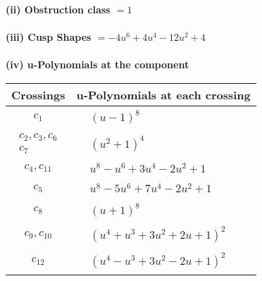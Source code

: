 \documentclass[1p]{elsarticle_modified}
\theoremstyle{definition}
\begin{document}
\flushleft \textbf{(ii) Obstruction class $= 1$}\\~\\
\flushleft \textbf{(iii) Cusp Shapes $= -4 u^6+4 u^4-12 u^2+4$}\\~\\
\newpage\renewcommand{\arraystretch}{1}
\flushleft \textbf{(iv) u-Polynomials at the component}\newline \\
\begin{tabular}{m{50pt}|m{274pt}}
Crossings & \hspace{64pt}u-Polynomials at each crossing \\
\hline $$\begin{aligned}c_{1}\end{aligned}$$&$\begin{aligned}
&(u-1)^8
\end{aligned}$\\
\hline $$\begin{aligned}c_{2},c_{3},c_{6}\\c_{7}\end{aligned}$$&$\begin{aligned}
&(u^2+1)^4
\end{aligned}$\\
\hline $$\begin{aligned}c_{4},c_{11}\end{aligned}$$&$\begin{aligned}
&u^8- u^6+3 u^4-2 u^2+1
\end{aligned}$\\
\hline $$\begin{aligned}c_{5}\end{aligned}$$&$\begin{aligned}
&u^8-5 u^6+7 u^4-2 u^2+1
\end{aligned}$\\
\hline $$\begin{aligned}c_{8}\end{aligned}$$&$\begin{aligned}
&(u+1)^8
\end{aligned}$\\
\hline $$\begin{aligned}c_{9},c_{10}\end{aligned}$$&$\begin{aligned}
&(u^4+u^3+3 u^2+2 u+1)^2
\end{aligned}$\\
\hline $$\begin{aligned}c_{12}\end{aligned}$$&$\begin{aligned}
&(u^4- u^3+3 u^2-2 u+1)^2
\end{aligned}$\\
\hline
\end{tabular}\\~\\
\end{document}
